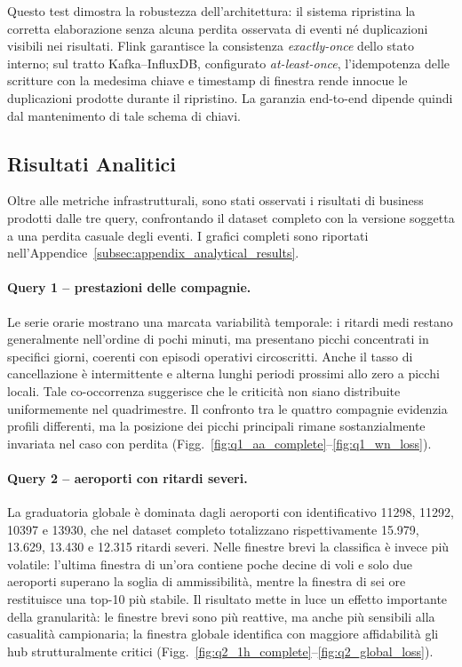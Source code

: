 \documentclass[conference]{IEEEtran}
\begin{document}
Questo test dimostra la robustezza dell'architettura: il sistema ripristina la corretta elaborazione senza alcuna perdita osservata di eventi né duplicazioni visibili nei risultati. Flink garantisce la consistenza \textit{exactly-once} dello stato interno; sul tratto Kafka--InfluxDB, configurato \textit{at-least-once}, l'idempotenza delle scritture con la medesima chiave e timestamp di finestra rende innocue le duplicazioni prodotte durante il ripristino. La garanzia end-to-end dipende quindi dal mantenimento di tale schema di chiavi.

\subsection{Risultati Analitici}\label{subsec:analytical_results}

Oltre alle metriche infrastrutturali, sono stati osservati i risultati di business prodotti dalle tre query, confrontando il dataset completo con la versione soggetta a una perdita casuale degli eventi. I grafici completi sono riportati nell'Appendice~\ref{subsec:appendix_analytical_results}.

\paragraph{Query 1 -- prestazioni delle compagnie.}
Le serie orarie mostrano una marcata variabilità temporale: i ritardi medi restano generalmente nell'ordine di pochi minuti, ma presentano picchi concentrati in specifici giorni, coerenti con episodi operativi circoscritti. Anche il tasso di cancellazione è intermittente e alterna lunghi periodi prossimi allo zero a picchi locali. Tale co-occorrenza suggerisce che le criticità non siano distribuite uniformemente nel quadrimestre. Il confronto tra le quattro compagnie evidenzia profili differenti, ma la posizione dei picchi principali rimane sostanzialmente invariata nel caso con perdita (Figg.~\ref{fig:q1_aa_complete}--\ref{fig:q1_wn_loss}).

\paragraph{Query 2 -- aeroporti con ritardi severi.}
La graduatoria globale è dominata dagli aeroporti con identificativo 11298, 11292, 10397 e 13930, che nel dataset completo totalizzano rispettivamente 15.979, 13.629, 13.430 e 12.315 ritardi severi. Nelle finestre brevi la classifica è invece più volatile: l'ultima finestra di un'ora contiene poche decine di voli e solo due aeroporti superano la soglia di ammissibilità, mentre la finestra di sei ore restituisce una top-10 più stabile. Il risultato mette in luce un effetto importante della granularità: le finestre brevi sono più reattive, ma anche più sensibili alla casualità campionaria; la finestra globale identifica con maggiore affidabilità gli hub strutturalmente critici (Figg.~\ref{fig:q2_1h_complete}--\ref{fig:q2_global_loss}).
\end{document}
